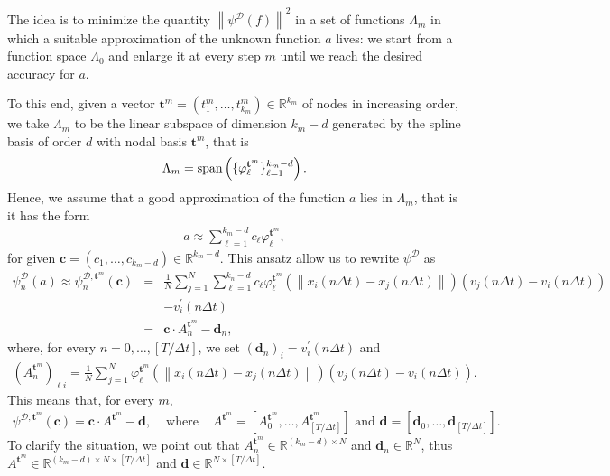 \documentclass[A4paper,11pt]{article}
\theoremstyle{definition}
\newcommand{\vnorm}[1]{\left\| #1 \right\|}
\begin{document}
The idea is to minimize the quantity $\vnorm{\psi^{\mathcal{D}}(f)}^2$ in a set of functions $\Lambda_m$ in which a suitable approximation of the unknown function $a$ lives: we start from a function space $\Lambda_0$ and enlarge it at every step $m$ until we reach the desired accuracy for $a$. 

To this end, given a vector $\mathbf{t}^m = (t^m_1, \ldots, t^m_{k_m}) \in \mathbb{R}^{k_m}$ of nodes in increasing order, we take $\Lambda_m$ to be the linear subspace of dimension $k_m - d$ generated by the spline basis of order $d$ with nodal basis $\mathbf{t}^m$, that is
\begin{align*}
\Lambda_m = \textup{span}\left(\{\varphi^{\mathbf{t}^m}_{\ell}\}_{\ell = 1}^{k_{m}-d}\right).
\end{align*}
Hence, we assume that a good approximation of the function $a$ lies in $\Lambda_m$, that is it has the form
\begin{align*}
a \approx \sum^{k_{m}-d}_{\ell = 1} c_{\ell} \varphi^{\mathbf{t}^m}_{\ell},
\end{align*}
for given $\mathbf{c} = (c_1, \ldots, c_{k_m - d}) \in \mathbb{R}^{k_m - d}$. This ansatz allow us to rewrite $\psi^{\mathcal{D}}$ as
\begin{eqnarray*}
\psi^{\mathcal{D}}_n(a) \approx \psi^{\mathcal{D}, \mathbf{t}^m}_n(\mathbf{c}) & = & \frac{1}{N} \sum^N_{j = 1} \sum^{k_{n}-d}_{\ell = 1} c_{\ell} \varphi^{\mathbf{t}^m}_{\ell} \!\! \left(\vnorm{x_i(n \Delta t) - x_j(n \Delta t)}\right)(v_j(n \Delta t) - v_i(n \Delta t)) \\
& & - v^{\prime}_i(n \Delta t) \\
& = & \mathbf{c} \cdot A^{\mathbf{t}^m}_n - \mathbf{d}_n,
\end{eqnarray*}
where, for every $n = 0, \ldots, [T/\Delta t]$, we set $(\mathbf{d}_n)_i = v^{\prime}_i(n \Delta t)$ and
\begin{align*}
(A_n^{\mathbf{t}^m})_{\ell i} = \frac{1}{N} \sum^N_{j = 1}\varphi^{\mathbf{t}^m}_{\ell} \left(\vnorm{x_i(n \Delta t) - x_j(n \Delta t)}\right)(v_j(n \Delta t) - v_i(n \Delta t)).
\end{align*}
This means that, for every $m$,
\begin{eqnarray*}
\psi^{\mathcal{D}, \mathbf{t}^m}(\mathbf{c}) = \mathbf{c} \cdot A^{\mathbf{t}^m} - \mathbf{d}, & \text{ where } & A^{\mathbf{t}^m} = [A^{\mathbf{t}^m}_0, \ldots, A^{\mathbf{t}^m}_{[T/\Delta t]}] \text{ and } \mathbf{d} = [\mathbf{d}_0, \ldots, \mathbf{d}_{[T/\Delta t]}].
\end{eqnarray*}
To clarify the situation, we point out that $A_n^{\mathbf{t}^m} \in \mathbb{R}^{(k_m - d)\times N}$ and $\mathbf{d}_n  \in \mathbb{R}^N$, thus $A^{\mathbf{t}^m} \in \mathbb{R}^{(k_m - d) \times N \times [T/\Delta t]}$ and $\mathbf{d} \in \mathbb{R}^{N \times [T/\Delta t]}$.
\end{document}
